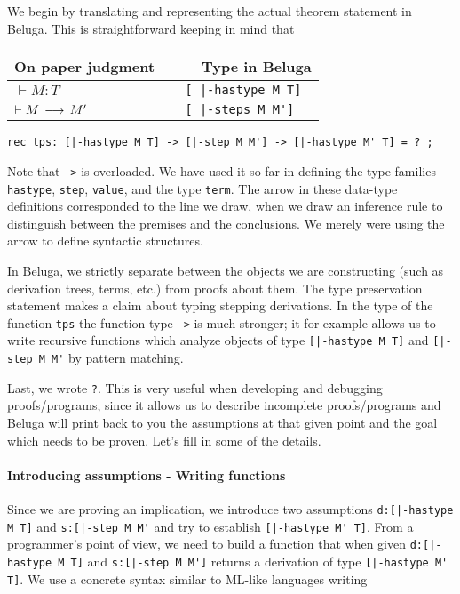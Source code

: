 We begin by translating and representing the actual theorem statement
in Beluga. This is straightforward keeping in mind that 

\begin{center}
\begin{tabular}{l|l}
On paper judgment~~ & ~~Type in Beluga \\
\hline
$\vdash M :T$ & \lstinline![ |-hastype M T]! \\
$\vdash M \mathrel{\,\longrightarrow\,} M'$ & \lstinline![ |-steps M M']! \\
\end{tabular}  
\end{center}


\begin{lstlisting}
rec tps: [|-hastype M T] -> [|-step M M'] -> [|-hastype M' T] = ? ;
\end{lstlisting}

Note that \lstinline!->! is overloaded. We have used it so far in defining
the type families \lstinline!hastype!, \lstinline!step!,
\lstinline!value!, and the type \lstinline!term!. The arrow in these
data-type definitions corresponded to the line we draw, when we draw an
inference rule to distinguish between the premises and the
conclusions. We merely were using the arrow to define syntactic
structures. 

In Beluga, we strictly separate between the objects we are
constructing (such as derivation trees, terms, etc.) from proofs about
them. The type preservation statement makes a claim about typing
stepping derivations. In the type of the function \lstinline!tps! the
function type \lstinline!->! is much stronger; it for example allows us to write
recursive functions which analyze objects of type \lstinline![|-hastype M T]! and
\lstinline![|-step M M'! by pattern matching.

Last, we wrote \lstinline!?!. This is very useful when developing and
debugging proofs/programs, since it allows us to describe incomplete
proofs/programs and Beluga will print back to you the assumptions at
that given point and the goal which needs to be proven. 
Let's fill in some of the details. 

\paragraph{Introducing assumptions - Writing functions} Since we are proving an
implication, we introduce two assumptions \lstinline!d:[|-hastype M T]! and 
\lstinline!s:[|-step M M'! and try to establish 
\lstinline![|-hastype M' T]!. From a programmer's point of view, we need
to build a function that when given \lstinline!d:[|-hastype M T]! and
\lstinline!s:[|-step M M']! returns a derivation of type
\lstinline![|-hastype M' T]!. We use a concrete syntax similar to
ML-like languages writing 

